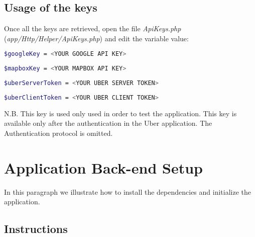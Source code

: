 \subsection{Usage of the keys}
Once all the keys are retrieved, open the file \textit{ApiKeys.php} (\textit{app/Http/Helper/ApiKeys.php}) and edit the variable value:
\begin{lstlisting}[language=bash]
	$googleKey = <YOUR GOOGLE API KEY>
\end{lstlisting}

\begin{lstlisting}[language=bash]
	$mapboxKey = <YOUR MAPBOX API KEY>
\end{lstlisting}

\begin{lstlisting}[language=bash]
	$uberServerToken = <YOUR UBER SERVER TOKEN>
\end{lstlisting}
	
\begin{lstlisting}[language=bash]
	$uberClientToken = <YOUR UBER CLIENT TOKEN>
\end{lstlisting}
N.B. This key is used only used in order to test the application. This key is available only after the authentication in the Uber application. The Authentication protocol is omitted.

\section{Application Back-end Setup}

In this paragraph we illustrate how to install the dependencies and initialize the application.\\

\subsection{Instructions}


